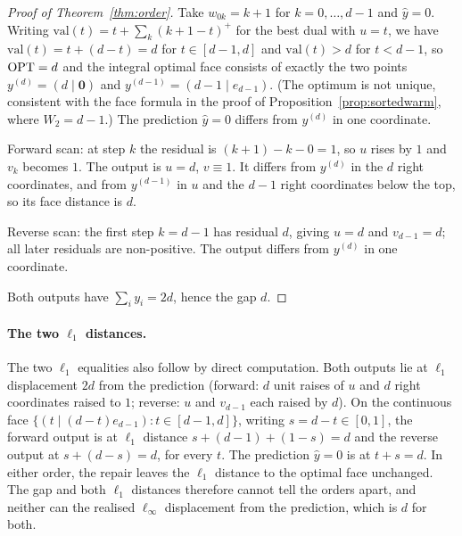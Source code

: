 \begin{proof}[Proof of Theorem~\ref{thm:order}]
Take $w_{0k} = k+1$ for $k = 0,\dots,d-1$ and $\hat{y} = 0$. Writing $\mathrm{val}(t) = t +
\sum_k (k+1-t)^+$ for the best dual with $u = t$, we have $\mathrm{val}(t) = t + (d - t) = d$ for
$t \in [d-1, d]$ and $\mathrm{val}(t) > d$ for $t < d-1$, so $\mathrm{OPT} = d$ and the integral optimal
face consists of exactly the two points $y^{(d)} = (d \mid \mathbf{0})$ and
$y^{(d-1)} = (d-1 \mid e_{d-1})$. (The optimum is not unique, consistent with the face formula in the
proof of Proposition~\ref{prop:sortedwarm}, where $W_2 = d-1$.) The prediction $\hat{y} = 0$
differs from $y^{(d)}$ in one coordinate.

Forward scan: at step $k$ the residual is $(k+1) - k - 0 = 1$, so $u$ rises by $1$ and $v_k$ becomes
$1$. The output is $u = d$, $v \equiv 1$. It differs from $y^{(d)}$ in the $d$ right coordinates,
and from $y^{(d-1)}$ in $u$ and the $d-1$ right coordinates below the top, so its face distance is
$d$.

Reverse scan: the first step $k = d-1$ has residual $d$, giving $u = d$ and $v_{d-1} = d$; all
later residuals are non-positive. The output differs from $y^{(d)}$ in one coordinate.

Both outputs have $\sum_i y_i = 2d$, hence the gap $d$.
\end{proof}

\paragraph{The two $\ell_1$ distances.} The two $\ell_1$ equalities also follow by direct computation. Both outputs lie
at $\ell_1$ displacement $2d$ from the prediction (forward: $d$ unit raises of $u$ and $d$ right
coordinates raised to $1$; reverse: $u$ and $v_{d-1}$ each raised by $d$). On the continuous face
$\{(t \mid (d-t)e_{d-1}) : t \in [d-1,d]\}$, writing $s = d - t \in [0,1]$, the forward output is at
$\ell_1$ distance $s + (d-1) + (1-s) = d$ and the reverse output at $s + (d-s) = d$, for every $t$.
The prediction $\hat y = 0$ is at $t + s = d$. In either order, the repair leaves the $\ell_1$
distance to the optimal face unchanged. The gap and both $\ell_1$ distances therefore cannot tell
the orders apart, and neither can the realised $\ell_\infty$ displacement from the prediction, which is
$d$ for both.

